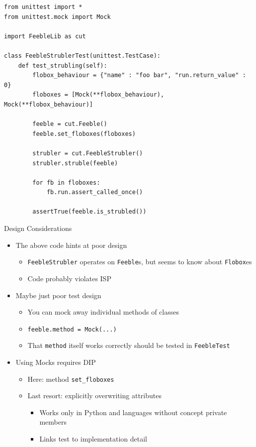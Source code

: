 \begin{frame}[fragile]
%
\vspace{-12pt}
\begin{codebox}[FeebleStrublerTest.py]
\begin{verbatim}
from unittest import *
from unittest.mock import Mock

import FeebleLib as cut

class FeebleStrublerTest(unittest.TestCase):
    def test_strubling(self):
        flobox_behaviour = {"name" : "foo bar", "run.return_value" : 0}
        floboxes = [Mock(**flobox_behaviour), Mock(**flobox_behaviour)]
        
        feeble = cut.Feeble()
        feeble.set_floboxes(floboxes)
        
        strubler = cut.FeebleStrubler()
        strubler.struble(feeble)
        
        for fb in floboxes:
            fb.run.assert_called_once()
        
        assertTrue(feeble.is_strubled()) 
\end{verbatim}
\end{codebox}
%
\end{frame}


\begin{frame}{Design Considerations}
%
\begin{itemize}
\item The above code hints at poor design
	\begin{itemize}
	\item \texttt{FeebleStrubler} operates on \texttt{Feeble}s, but seems to know about \texttt{Flobox}es
	\item Code probably violates ISP
	\end{itemize}
\pause
\item Maybe just poor test design
	\begin{itemize}
	\item You can mock away individual methods of classes
	\item \texttt{feeble.method = Mock(...)}
	\item That \texttt{method} itself works correctly should be tested in \texttt{FeebleTest}
	\end{itemize}
\pause
\item Using Mocks requires DIP
	\begin{itemize}
	\item Here: method \texttt{set\_floboxes}
	\item Last resort: explicitly overwriting attributes
		\begin{itemize}
		\item Works only in Python and languages without concept private members
		\item Links test to implementation detail
		\end{itemize}
	\end{itemize}
\end{itemize}
%
\end{frame}

